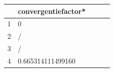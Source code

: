 \begin{table}[H]
\begin{tabular}{lllll}
\rowcolor[HTML]{9AB4FF} 
\multicolumn{1}{c}{\cellcolor[HTML]{9AB4FF} functie $f_i$} & \multicolumn{1}{c}{\cellcolor[HTML]{9AB4FF} convergentiefactor*}\\ \hline
1 & 0 \\ \hline2 & / \\ \hline3 & / \\ \hline4 & 0.665314111499160 \\ \hline\end{tabular}
\end{table}
\caption{Tabel met convergentiefactoren.}
